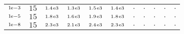 \begin{tiny}
\begin{tabular}{@{$\;$}c@{$\;$}|@{$\;$}c@{$\;$}@{$\;$}c@{$\;$}@{$\;$}c@{$\;$}@{$\;$}c@{$\;$}@{$\;$}c@{$\;$}|@{$\;$}c@{$\;$}@{$\;$}c@{$\;$}@{$\;$}c@{$\;$}@{$\;$}c@{$\;$}@{$\;$}c@{$\;$}}
$\scriptstyle1\!\mathrm{\hspace{0.10em}e}-3$ & $\scriptstyle15$ & $\scriptstyle1.4\mathrm{\hspace{0.10em}e}3$ & $\scriptstyle1.3\mathrm{\hspace{0.10em}e}3$ & $\scriptstyle1.5\mathrm{\hspace{0.10em}e}3$ & $\scriptstyle1.4\mathrm{\hspace{0.10em}e}3$ & $\scriptstyle.$ & $\scriptstyle.$ & $\scriptstyle.$ & $\scriptstyle.$ & $\scriptstyle.$\\ 
$\scriptstyle1\!\mathrm{\hspace{0.10em}e}-5$ & $\scriptstyle15$ & $\scriptstyle1.8\mathrm{\hspace{0.10em}e}3$ & $\scriptstyle1.6\mathrm{\hspace{0.10em}e}3$ & $\scriptstyle1.9\mathrm{\hspace{0.10em}e}3$ & $\scriptstyle1.8\mathrm{\hspace{0.10em}e}3$ & $\scriptstyle.$ & $\scriptstyle.$ & $\scriptstyle.$ & $\scriptstyle.$ & $\scriptstyle.$\\ 
$\scriptstyle1\!\mathrm{\hspace{0.10em}e}-8$ & $\scriptstyle15$ & $\scriptstyle2.3\mathrm{\hspace{0.10em}e}3$ & $\scriptstyle2.1\mathrm{\hspace{0.10em}e}3$ & $\scriptstyle2.4\mathrm{\hspace{0.10em}e}3$ & $\scriptstyle2.3\mathrm{\hspace{0.10em}e}3$ & $\scriptstyle.$ & $\scriptstyle.$ & $\scriptstyle.$ & $\scriptstyle.$ & $\scriptstyle.$\\ 
\end{tabular} 
\end{tiny} 
